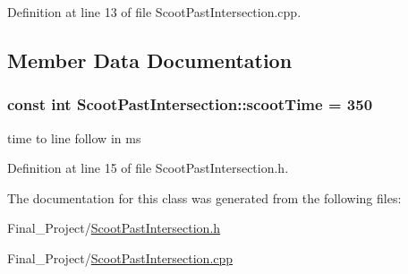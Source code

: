 Definition at line 13 of file Scoot\-Past\-Intersection.\-cpp.



\subsection{Member Data Documentation}
\hypertarget{classScootPastIntersection_acfb41e5180724c0ffb71c841e0bb9ec3}{
\subsubsection[{scoot\-Time}]{\setlength{\rightskip}{0pt plus 5cm}const int Scoot\-Past\-Intersection\-::scoot\-Time = 350\hspace{0.3cm}{\ttfamily [private]}}}\label{classScootPastIntersection_acfb41e5180724c0ffb71c841e0bb9ec3}


time to line follow in ms 



Definition at line 15 of file Scoot\-Past\-Intersection.\-h.



The documentation for this class was generated from the following files\-:\begin{DoxyCompactItemize}
\item 
Final\-\_\-\-Project/\hyperlink{ScootPastIntersection_8h}{Scoot\-Past\-Intersection.\-h}\item 
Final\-\_\-\-Project/\hyperlink{ScootPastIntersection_8cpp}{Scoot\-Past\-Intersection.\-cpp}\end{DoxyCompactItemize}
